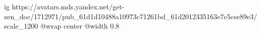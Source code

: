  
 
 
 
 

\ifcmt
  ig https://avatars.mds.yandex.net/get-zen_doc/1712971/pub_61d1d10488a10973c71261bd_61d2012335163e7c5cee89e3/scale_1200
	@wrap center
	@width 0.8
\fi
